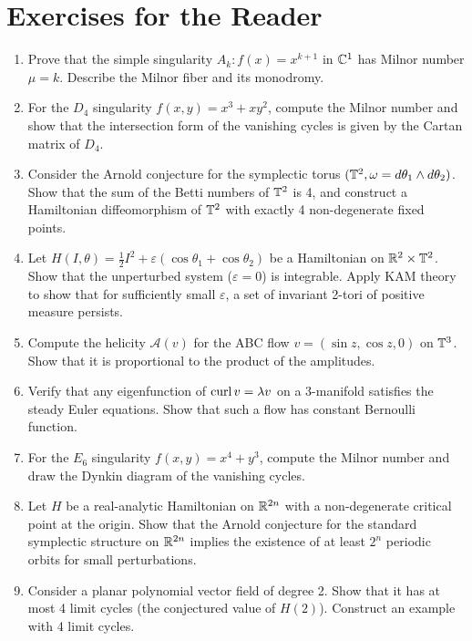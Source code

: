 \section*{Exercises for the Reader}

\begin{enumerate}
    \item [B] Prove that the simple singularity \(A_k: f(x) = x^{k+1}\) in \(\mathbb{C}^1\) has Milnor number \(\mu = k\). Describe the Milnor fiber and its monodromy.
    \item [I] For the \(D_4\) singularity \(f(x,y) = x^3 + x y^2\), compute the Milnor number and show that the intersection form of the vanishing cycles is given by the Cartan matrix of \(D_4\).
    \item [B] Consider the Arnold conjecture for the symplectic torus \((\mathbb{T}^2,\omega = d\theta_1 \wedge d\theta_2)\). Show that the sum of the Betti numbers of \(\mathbb{T}^2\) is 4, and construct a Hamiltonian diffeomorphism of \(\mathbb{T}^2\) with exactly 4 non-degenerate fixed points.
    \item [I] Let \(H(I,\theta) = \frac{1}{2}I^2 + \varepsilon(\cos\theta_1 + \cos\theta_2)\) be a Hamiltonian on \(\mathbb{R}^2 \times \mathbb{T}^2\). Show that the unperturbed system (\(\varepsilon = 0\)) is integrable. Apply KAM theory to show that for sufficiently small \(\varepsilon\), a set of invariant 2-tori of positive measure persists.
    \item [B] Compute the helicity \(\mathcal{A}(v)\) for the ABC flow \(v = (\sin z, \cos z, 0)\) on \(\mathbb{T}^3\). Show that it is proportional to the product of the amplitudes.
    \item [B] Verify that any eigenfunction of \(\operatorname{curl} v = \lambda v\) on a 3-manifold satisfies the steady Euler equations. Show that such a flow has constant Bernoulli function.
    \item [I] For the \(E_6\) singularity \(f(x,y) = x^4 + y^3\), compute the Milnor number and draw the Dynkin diagram of the vanishing cycles.
    \item [I] Let \(H\) be a real-analytic Hamiltonian on \(\mathbb{R}^{2n}\) with a non-degenerate critical point at the origin. Show that the Arnold conjecture for the standard symplectic structure on \(\mathbb{R}^{2n}\) implies the existence of at least \(2^n\) periodic orbits for small perturbations.
    \item [A] Consider a planar polynomial vector field of degree 2. Show that it has at most 4 limit cycles (the conjectured value of \(H(2)\)). Construct an example with 4 limit cycles.

\end{enumerate}

